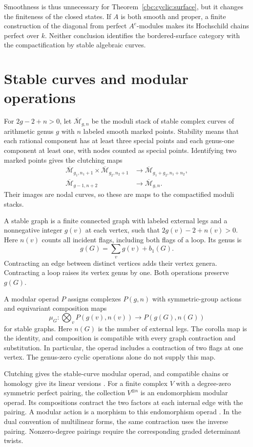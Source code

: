 Smoothness is thus unnecessary for Theorem~\ref{cbc:cyclic:surface}, but it changes the finiteness of the closed states.
If $A$ is both smooth and proper, a finite construction of the diagonal from perfect $A^e$-modules makes its Hochschild chains perfect over $k$.
Neither conclusion identifies the bordered-surface category with the compactification by stable algebraic curves.

\section{Stable curves and modular operations}

For $2g-2+n>0$, let $\overline{\mathcal M}_{g,n}$ be the moduli stack of stable complex curves of arithmetic genus $g$ with $n$ labeled smooth marked points.
Stability means that each rational component has at least three special points and each genus-one component at least one, with nodes counted as special points.
Identifying two marked points gives the clutching maps
\begin{align}
 \overline{\mathcal M}_{g_1,n_1+1}\times
 \overline{\mathcal M}_{g_2,n_2+1}
 &\longrightarrow\overline{\mathcal M}_{g_1+g_2,n_1+n_2},
 \label{eq:cbc:cyclic:separating}\\
 \overline{\mathcal M}_{g-1,n+2}
 &\longrightarrow\overline{\mathcal M}_{g,n}.
 \label{eq:cbc:cyclic:nonseparating}
\end{align}
Their images are nodal curves, so these are maps to the compactified moduli stacks.

A stable graph is a finite connected graph with labeled external legs and a nonnegative integer $g(v)$ at each vertex, such that $2g(v)-2+n(v)>0$.
Here $n(v)$ counts all incident flags, including both flags of a loop.
Its genus is
\[
 g(G)=\sum_v g(v)+b_1(G).
\]
Contracting an edge between distinct vertices adds their vertex genera.
Contracting a loop raises its vertex genus by one.
Both operations preserve $g(G)$.

A modular operad $P$ assigns complexes $P(g,n)$ with symmetric-group actions and equivariant composition maps
\[
 \mu_G:\bigotimes_v P(g(v),n(v))\longrightarrow P(g(G),n(G))
\]
for stable graphs.
Here $n(G)$ is the number of external legs.
The corolla map is the identity, and composition is compatible with every graph contraction and substitution.
In particular, the operad includes a contraction of two flags at one vertex.
The genus-zero cyclic operations alone do not supply this map.

Clutching gives the stable-curve modular operad, and compatible chains or homology give its linear versions \cite[\S6.2]{GetzlerKapranov}.
For a finite complex $V$ with a degree-zero symmetric perfect pairing, the collection $V^{\otimes n}$ is an endomorphism modular operad.
Its compositions contract the two factors at each internal edge with the pairing.
A modular action is a morphism to this endomorphism operad \cite[\S2.25]{GetzlerKapranov}.
In the dual convention of multilinear forms, the same contraction uses the inverse pairing.
Nonzero-degree pairings require the corresponding graded determinant twists.

